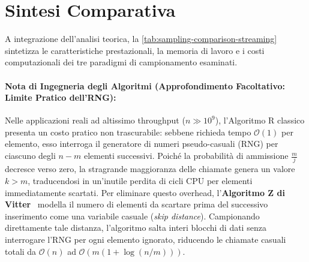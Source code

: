 \FloatBarrier
\section{Sintesi Comparativa}
\label{sec:comparative-synthesis}

A integrazione dell'analisi teorica, la \autoref{tab:sampling-comparison-streaming} sintetizza le caratteristiche prestazionali, la memoria di lavoro e i costi computazionali dei tre paradigmi di campionamento esaminati.

\begin{table}[H]
  \centering
  \caption{Confronto sintetico tra le metodologie di campionamento su flussi di dati.}
  \label{tab:sampling-comparison-streaming}
\end{table}

\paragraph{Nota di Ingegneria degli Algoritmi (Approfondimento Facoltativo: Limite Pratico dell'RNG):}
Nelle applicazioni reali ad altissimo throughput ($n \gg 10^9$), l'Algoritmo R classico presenta un costo pratico non trascurabile: sebbene richieda tempo $\mathcal{O}(1)$ per elemento, esso interroga il generatore di numeri pseudo-casuali (RNG) per ciascuno degli $n - m$ elementi successivi. Poiché la probabilità di ammissione $\frac{m}{j}$ decresce verso zero, la stragrande maggioranza delle chiamate genera un valore $k > m$, traducendosi in un'inutile perdita di cicli CPU per elementi immediatamente scartati.
Per eliminare questo overhead, l'\textbf{Algoritmo Z di Vitter}~\cite{vitter1985} modella il numero di elementi da scartare prima del successivo inserimento come una variabile casuale (\textit{skip distance}). Campionando direttamente tale distanza, l'algoritmo salta interi blocchi di dati senza interrogare l'RNG per ogni elemento ignorato, riducendo le chiamate casuali totali da $\mathcal{O}(n)$ ad $\mathcal{O}(m(1 + \log(n/m)))$.
